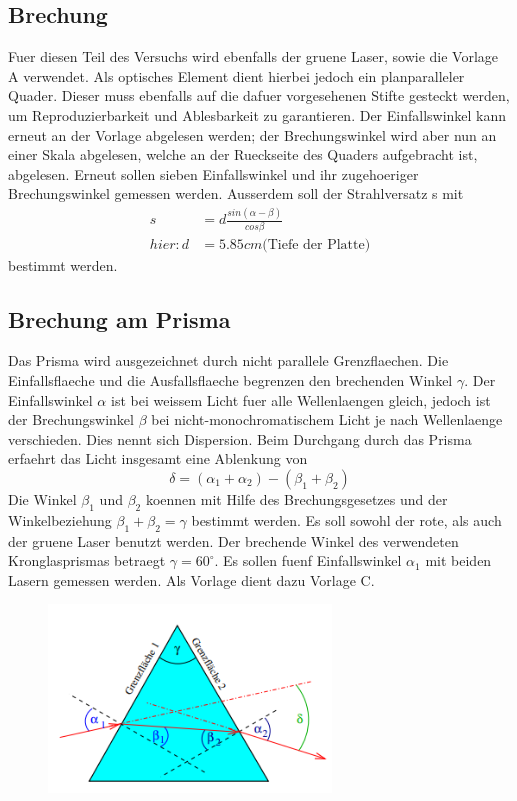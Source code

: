 \subsection{Brechung}
Fuer diesen Teil des Versuchs wird ebenfalls der gruene Laser, sowie die Vorlage A verwendet. Als optisches Element dient hierbei jedoch ein planparalleler Quader. Dieser muss ebenfalls auf die dafuer vorgesehenen Stifte gesteckt werden, um Reproduzierbarkeit und Ablesbarkeit zu garantieren. Der Einfallswinkel kann erneut an der Vorlage abgelesen werden; der Brechungswinkel wird aber nun an einer Skala abgelesen, welche an der Rueckseite des Quaders aufgebracht ist, abgelesen. Erneut sollen sieben Einfallswinkel und ihr zugehoeriger Brechungswinkel gemessen werden. Ausserdem soll der Strahlversatz s mit
\begin{align}
    s&=d\frac{sin(\alpha-\beta)}{cos\beta}\\
    hier: d&=5.85cm \text{(Tiefe der Platte)}
\end{align}
bestimmt werden.
\subsection{Brechung am Prisma}
Das Prisma wird ausgezeichnet durch nicht parallele Grenzflaechen. Die Einfallsflaeche und die Ausfallsflaeche begrenzen den brechenden Winkel $\gamma$. Der Einfallswinkel $\alpha$ ist bei weissem Licht fuer alle Wellenlaengen gleich, jedoch ist der Brechungswinkel $\beta$ bei nicht-monochromatischem Licht je nach Wellenlaenge verschieden. Dies nennt sich Dispersion. Beim Durchgang durch das Prisma erfaehrt das Licht insgesamt eine Ablenkung von
\begin{equation}
    \delta=(\alpha_1+\alpha_2)-(\beta_1+\beta_2)
\end{equation}
Die Winkel $\beta_1$ und $\beta_2$ koennen mit Hilfe des Brechungsgesetzes und der Winkelbeziehung $\beta_1+\beta_2=\gamma$ bestimmt werden. Es soll sowohl der rote, als auch der gruene Laser benutzt werden. Der brechende Winkel des verwendeten Kronglasprismas betraegt $\gamma=60^{\circ}$. Es sollen fuenf Einfallswinkel $\alpha_1$ mit beiden Lasern gemessen werden. Als Vorlage dient dazu Vorlage C.
\begin{figure}[H]
    \centering
    \captionsetup{justification=centering}
    \includegraphics[height=5cm]{"Prisma_Beugung.png"}
    \label{Fig:Prisma}
\end{figure}
